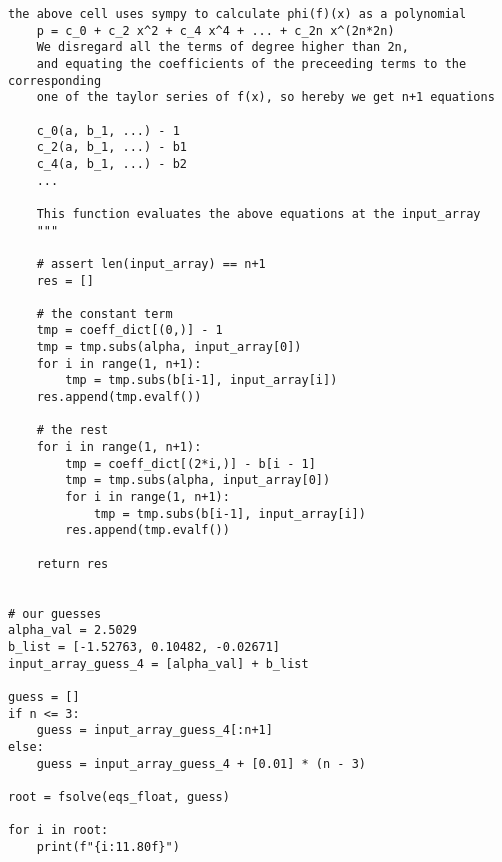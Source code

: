 \begin{lstlisting}[style=python]
    the above cell uses sympy to calculate phi(f)(x) as a polynomial
    p = c_0 + c_2 x^2 + c_4 x^4 + ... + c_2n x^(2n*2n)
    We disregard all the terms of degree higher than 2n,
    and equating the coefficients of the preceeding terms to the corresponding
    one of the taylor series of f(x), so hereby we get n+1 equations 

    c_0(a, b_1, ...) - 1 
    c_2(a, b_1, ...) - b1 
    c_4(a, b_1, ...) - b2
    ...

    This function evaluates the above equations at the input_array
    """

    # assert len(input_array) == n+1
    res = []

    # the constant term
    tmp = coeff_dict[(0,)] - 1
    tmp = tmp.subs(alpha, input_array[0])
    for i in range(1, n+1):
        tmp = tmp.subs(b[i-1], input_array[i])
    res.append(tmp.evalf())

    # the rest
    for i in range(1, n+1):
        tmp = coeff_dict[(2*i,)] - b[i - 1]
        tmp = tmp.subs(alpha, input_array[0])
        for i in range(1, n+1):
            tmp = tmp.subs(b[i-1], input_array[i])
        res.append(tmp.evalf())

    return res


# our guesses
alpha_val = 2.5029
b_list = [-1.52763, 0.10482, -0.02671]
input_array_guess_4 = [alpha_val] + b_list

guess = []
if n <= 3:
    guess = input_array_guess_4[:n+1]
else:
    guess = input_array_guess_4 + [0.01] * (n - 3)

root = fsolve(eqs_float, guess)

for i in root:
    print(f"{i:11.80f}")
\end{lstlisting}

